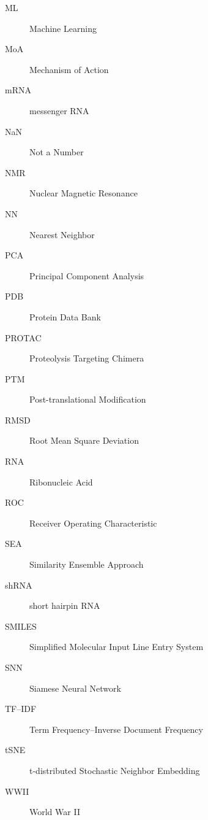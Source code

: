 \begin{description}
    \item[ML] Machine Learning
    \item[MoA] Mechanism of Action
    \item[mRNA] messenger RNA
    \item[NaN] Not a Number
    \item[NMR] Nuclear Magnetic Resonance
    \item[NN] Nearest Neighbor
    \item[PCA] Principal Component Analysis
    \item[PDB] Protein Data Bank
    \item[PROTAC] Proteolysis Targeting Chimera
    \item[PTM] Post-translational Modification
    \item[RMSD] Root Mean Square Deviation
    \item[RNA] Ribonucleic Acid
    \item[ROC] Receiver Operating Characteristic
    \item[SEA] Similarity Ensemble Approach
    \item[shRNA] short hairpin RNA
    \item[SMILES] Simplified Molecular Input Line Entry System
    \item[SNN] Siamese Neural Network
    \item[TF–IDF] Term Frequency–Inverse Document Frequency
    \item[tSNE] t-distributed Stochastic Neighbor Embedding
    \item[WWII] World War II
\end{description}

